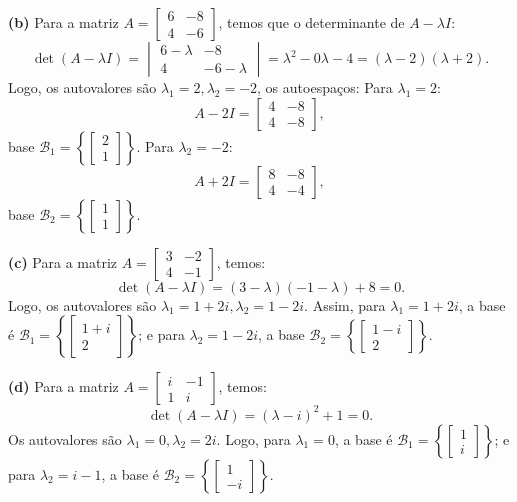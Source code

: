 \begin{resolution}
  {\bf (b)} Para a matriz \( A = \begin{bmatrix} 6 & -8 \\ 4 & -6 \end{bmatrix} \), temos que o determinante de \( A - \lambda I \):
  \[
    \det(A - \lambda I) = \begin{vmatrix} 6 - \lambda & -8 \\ 4 & -6 - \lambda \end{vmatrix} = \lambda^2 - 0\lambda - 4 = (\lambda - 2)(\lambda + 2).
  \]
  Logo, os autovalores são \( \lambda_1 = 2, \lambda_2 = -2 \), os autoespaços:
  Para \( \lambda_1 = 2 \):
  $$ A - 2I = \begin{bmatrix} 4 & -8 \\ 4 & -8 \end{bmatrix},$$ base \( \mathcal{B}_1 = \left\{ \begin{bmatrix} 2 \\ 1 \end{bmatrix} \right\} \).
  Para \( \lambda_2 = -2 \):
  $$ A + 2I = \begin{bmatrix} 8 & -8 \\ 4 & -4 \end{bmatrix},$$ base \( \mathcal{B}_2 = \left\{ \begin{bmatrix} 1 \\ 1 \end{bmatrix} \right\} \).

  \vspace{12pt}
  {\bf (c)} Para a matriz \( A = \begin{bmatrix} 3 & -2 \\ 4 & -1 \end{bmatrix} \), temos:
  $$ \det(A - \lambda I) = (3 - \lambda)(-1  - \lambda) + 8 = 0 .$$
  Logo, os autovalores são \( \lambda_1 = 1 + 2i, \lambda_2 = 1 - 2i \). Assim,
  para \( \lambda_1 = 1 + 2i\), a base é \( \mathcal{B}_1 = \left\{ \begin{bmatrix} 1 + i \\ 2 \end{bmatrix} \right\} \); e
  para \( \lambda_2 = 1 - 2i \), a base \( \mathcal{B}_2 = \left\{ \begin{bmatrix} 1 - i\\ 2 \end{bmatrix} \right\} \).

  \vspace{12pt}
  {\bf (d)} Para a matriz \( A = \begin{bmatrix} i & -1 \\ 1 & i \end{bmatrix} \), temos:
  $$\det(A - \lambda I) = (\lambda - i)^2 + 1 = 0.$$
  Os autovalores são \( \lambda_1 = 0, \lambda_2 = 2i \). Logo, para \( \lambda_1 = 0\), a base é \( \mathcal{B}_1 = \left\{ \begin{bmatrix} 1 \\ i \end{bmatrix} \right\} \); e para \( \lambda_2 = i - 1 \), a base é \( \mathcal{B}_2 = \left\{ \begin{bmatrix} 1 \\ -i \end{bmatrix} \right\} \).


\end{resolution}
